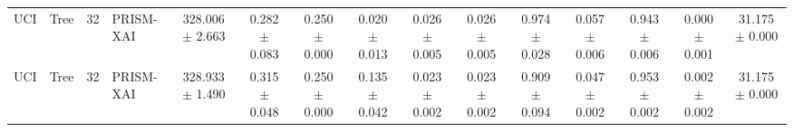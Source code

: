\begin{table}[t]
\begin{tabular}{llllccccccccccc}
UCI & Tree & 32 & PRISM-XAI & 328.006 $\pm$ 2.663 & 0.282 $\pm$ 0.083 & 0.250 $\pm$ 0.000 & 0.020 $\pm$ 0.013 & 0.026 $\pm$ 0.005 & 0.026 $\pm$ 0.005 & 0.974 $\pm$ 0.028 & 0.057 $\pm$ 0.006 & 0.943 $\pm$ 0.006 & 0.000 $\pm$ 0.001 & 31.175 $\pm$ 0.000 \\
UCI & Tree & 32 & PRISM-XAI & 328.933 $\pm$ 1.490 & 0.315 $\pm$ 0.048 & 0.250 $\pm$ 0.000 & 0.135 $\pm$ 0.042 & 0.023 $\pm$ 0.002 & 0.023 $\pm$ 0.002 & 0.909 $\pm$ 0.094 & 0.047 $\pm$ 0.002 & 0.953 $\pm$ 0.002 & 0.002 $\pm$ 0.002 & 31.175 $\pm$ 0.000 \\
\bottomrule
\end{tabular}
\end{table}
